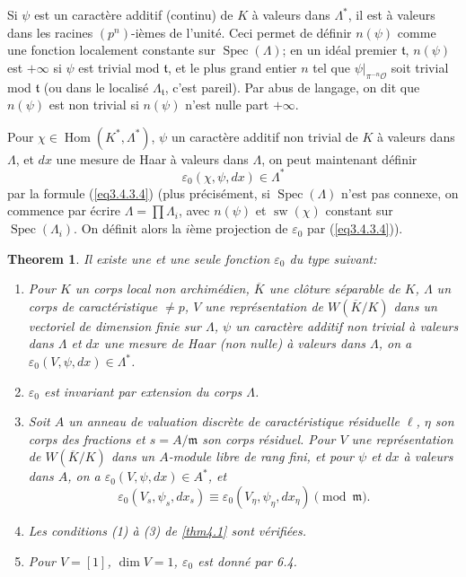\documentclass[11pt,a4paper]{amsart}
\theoremstyle{plain}
\newtheorem{theorem}{Theorem}[section]
\theoremstyle{definition}
\DeclareMathOperator{\Hom}{Hom}
\DeclareMathOperator{\Spec}{Spec}
\DeclareMathOperator{\sw}{sw}
\def\dim{\mathop{\mathrm{dim}}\nolimits}
\newenvironment{para}{\par\noindent}{\par}
\newcommand{\scrO}{\mathscr{O}}
\newcommand{\fht}{\mathfrak{t}}
\newcommand{\ov}[1]{\overline{#1}}
\newcommand{\eps}{\varepsilon}
\begin{document}
\begin{para}
Si $\psi$ est un caract\`ere additif (continu) de $K$ \`a valeurs dans $\Lambda^{*}$, il est \`a valeurs dans les racines $(p^{n})$-i\`emes de l'unit\'e. Ceci permet de d\'efinir $n(\psi)$ comme une fonction localement constante sur $\Spec(\Lambda)$; en un id\'eal premier $\fht$, $n(\psi)$ est $+\infty$ si $\psi$ est trivial mod $\fht$, et le plus grand entier $n$ tel que $\psi|_{\pi^{-n}\scrO}$ soit trivial mod $\fht$ (ou dans le localis\'e $\Lambda_{\fht}$, c'est pareil). Par abus de langage, on dit que $n(\psi)$ est non trivial si $n(\psi)$ n'est nulle part $+\infty$.
\end{para}

\begin{para}
Pour $\chi \in \Hom(K^{*}, \Lambda^{*})$, $\psi$ un caract\`ere additif non trivial de $K$ \`a valeurs dans $\Lambda$, et $dx$ une mesure de Haar \`a valeurs dans $\Lambda$, on peut maintenant d\'efinir
\[
\eps_{0}(\chi,\psi,dx) \in \Lambda^{*}
\]
par la formule (\ref{eq3.4.3.4}) (plus pr\'ecis\'ement, si $\Spec(\Lambda)$ n'est pas connexe, on commence par \'ecrire $\Lambda = \prod \Lambda_{i}$, avec $n(\psi)$ et $\sw(\chi)$ constant sur $\Spec(\Lambda_{i})$. On d\'efinit alors la $i$\`eme projection de $\eps_{0}$ par (\ref{eq3.4.3.4})).
\end{para}

\begin{theorem}\label{thm6.5}
Il existe une et une seule fonction $\eps_{0}$ du type suivant:
\begin{enumerate}
\item[\rm(a)] Pour $K$ un corps local non archim\'edien, $\ov{K}$ une cl\^oture s\'eparable de $K$, $\Lambda$ un corps de caract\'eristique $\not= p$, $V$ une repr\'esentation de $W(\ov{K}/K)$ dans un vectoriel de dimension finie sur $\Lambda$, $\psi$ un caract\`ere additif non trivial \`a valeurs dans $\Lambda$ et $dx$ une mesure de Haar (non nulle) \`a valeurs dans $\Lambda$, on a $\eps_{0}(V,\psi,dx) \in \Lambda^{*}$.
\item[\rm(b)] $\eps_{0}$ est invariant par extension du corps $\Lambda$.
\item[\rm(c)] Soit $A$ un anneau de valuation discr\`ete de caract\'eristique r\'esiduelle $\ell$, $\eta$ son corps des fractions et $s = A/\mathfrak{m}$ son corps r\'esiduel. Pour $V$ une repr\'esentation de $W(\ov{K}/K)$ dans un $A$-module libre de rang fini, et pour $\psi$ et $dx$ \`a valeurs dans $A$, on a $\eps_{0}(V,\psi,dx) \in A^{*}$, et
\[
\eps_{0}(V_{s}, \psi_{s}, dx_{s}) \equiv \eps_{0}(V_{\eta}, \psi_{\eta}, dx_{\eta}) \pmod{\mathfrak{m}}.
\]
\item[\rm(d)] Les conditions (1) \`a (3) de \ref{thm4.1} sont v\'erifi\'ees.
\item[\rm(e)] Pour $V = [1]$, $\dim V = 1$, $\eps_{0}$ est donn\'e par 6.4.
\end{enumerate}
\end{theorem}
\end{document}
